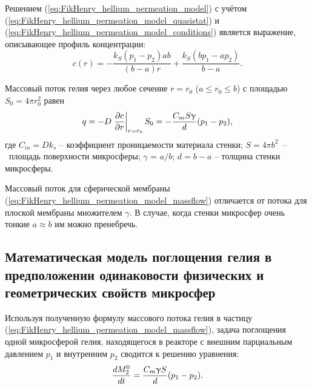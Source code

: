 Решением (\ref{eq:FikHenry_hellium_permeation_model}) с учётом (\ref{eq:FikHenry_hellium_permeation_model_quasistat}) и (\ref{eq:FikHenry_hellium_permeation_model_conditions}) является выражение, описывающее профиль концентрации:
\begin{equation}
\label{eq:eq:FikHenry_hellium_permeation_model_solution}
c(r) = -\frac{k_S(p_1-p_2)ab}{(b-a)r}+\frac{k_S(bp_1-ap_2)}{b-a}.
\end{equation}

Массовый поток гелия через любое сечение $r=r_0$ ($a\leq r_0 \leq b$) с площадью $S_0=4\pi r_0^2$ равен
\begin{equation}
\label{eq:FikHenry_hellium_permeation_model_massflow}
q = -D \left. \frac{\partial c}{\partial r} \right|_{r=r_0}S_0=-\frac{C_m S \upgamma}{d}(p_1-p_2),
\end{equation}
где $C_m = D k_s$ -- коэффициент проницаемости материала стенки; $S=4 \pi b^2$~--~площадь поверхности микросферы; $\gamma$ = $a/b$; $d=b-a$ -- толщина стенки микросферы.

Массовый поток для сферической мембраны (\ref{eq:FikHenry_hellium_permeation_model_massflow}) отличается от потока для плоской мембраны \cite{Hvang, Ditnerskiy, Mulder} множителем $\gamma$. В случае, когда стенки микросфер очень тонкие $a \approx b$ им можно пренебречь.

\subsection{Математическая модель поглощения гелия в предположении одинаковости физических и геометрических свойств микросфер}

Используя полученную формулу массового потока гелия в частицу (\ref{eq:FikHenry_hellium_permeation_model_massflow}), задача поглощения одной микросферой гелия, находящегося в реакторе с внешним парциальным давлением $p_1$ и внутренним $p_2$ сводится к решению уравнения:
\begin{equation}
\label{eq:one_particle_permiation}
\frac{dM^0_2}{dt}= \frac{C_m\upgamma S}{d}(p_1-p_2).
\end{equation}
%


